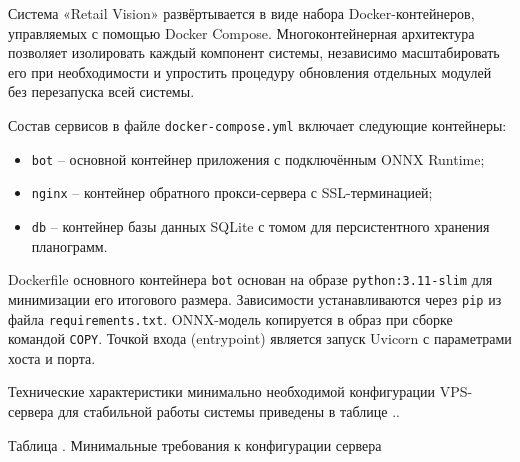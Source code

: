 {\gostFont

	\par \redline Система «Retail Vision» развёртывается в виде набора Docker-контейнеров, управляемых с помощью Docker Compose.
	Многоконтейнерная архитектура позволяет изолировать каждый компонент системы, независимо масштабировать его при необходимости и упростить процедуру обновления отдельных модулей без перезапуска всей системы.
	\par \redline Состав сервисов в файле \texttt{docker-compose.yml} включает следующие контейнеры:

	\begin{itemize}[leftmargin=2.15cm, labelwidth=0.65cm, labelsep=0.0cm, itemsep=0pt, parsep=0pt]
		\item[\theitemcntr.] \texttt{bot} {--} основной контейнер приложения с подключённым ONNX Runtime;
		\addtocounter{itemcntr}{1}

		\item[\theitemcntr.] \texttt{nginx} {--} контейнер обратного прокси-сервера с SSL-терминацией;
		\addtocounter{itemcntr}{1}

		\item[\theitemcntr.] \texttt{db} {--} контейнер базы данных SQLite с томом для персистентного хранения планограмм.
		\addtocounter{itemcntr}{1}
	\end{itemize} \setcounter{itemcntr}{1}

	\par \redline Dockerfile основного контейнера \texttt{bot} основан на образе \texttt{python:3.11-slim} для минимизации его итогового размера.
	Зависимости устанавливаются через \texttt{pip} из файла \texttt{requirements.txt}. ONNX-модель копируется в образ при сборке командой \texttt{COPY}.
	Точкой входа (entrypoint) является запуск Uvicorn с параметрами хоста и порта.
	\par \redline Технические характеристики минимально необходимой конфигурации VPS-сервера для стабильной работы системы приведены в таблице \thechaptercntr .\thetablecntr.
	
	\topTablespace
	{\begin{Center}
		\par \gostFont Таблица \thechaptercntr .\thetablecntr \spc {--} Минимальные требования к конфигурации сервера


\end{Center}}}
